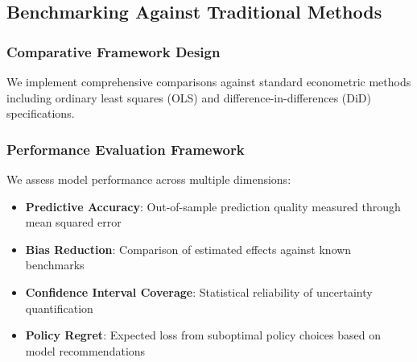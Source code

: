 \subsection{Benchmarking Against Traditional Methods}\label{subsec:benchmark}

\subsubsection{Comparative Framework Design}
We implement comprehensive comparisons against standard econometric methods including ordinary least squares (OLS) and difference-in-differences (DiD) specifications.

\subsubsection{Performance Evaluation Framework}
We assess model performance across multiple dimensions:
\begin{itemize}
    \item \textbf{Predictive Accuracy}: Out-of-sample prediction quality measured through mean squared error
    \item \textbf{Bias Reduction}: Comparison of estimated effects against known benchmarks
    \item \textbf{Confidence Interval Coverage}: Statistical reliability of uncertainty quantification
    \item \textbf{Policy Regret}: Expected loss from suboptimal policy choices based on model recommendations
\end{itemize}
